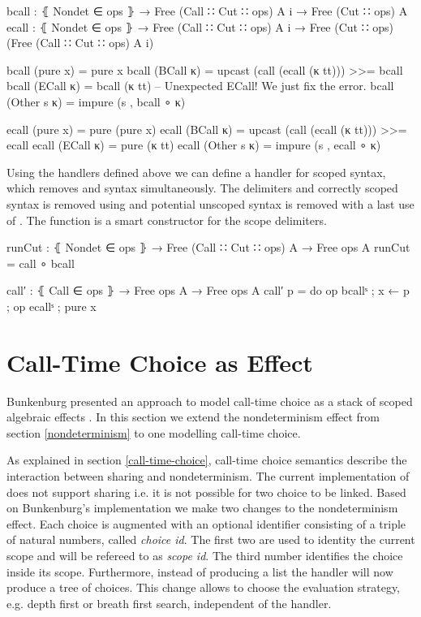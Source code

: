 \begin{code}
bcall : ⦃ Nondet ∈ ops ⦄ → Free (Call ∷ Cut ∷ ops) A {i} → Free (Cut ∷ ops) A
ecall : ⦃ Nondet ∈ ops ⦄ → Free (Call ∷ Cut ∷ ops) A {i}
  → Free (Cut ∷ ops) (Free (Call ∷ Cut ∷ ops) A {i})

bcall (pure x)     = pure x
bcall (BCall κ)    = upcast (call (ecall (κ tt))) >>= bcall
bcall (ECall κ)    = bcall (κ tt) -- Unexpected ECall! We just fix the error.
bcall (Other s κ)  = impure (s , bcall ∘ κ)

ecall (pure x)     = pure (pure x)
ecall (BCall κ)    = upcast (call (ecall (κ tt))) >>= ecall
ecall (ECall κ)    = pure (κ tt)
ecall (Other s κ)  = impure (s , ecall ∘ κ)
\end{code}
Using the handlers defined above we can define a handler for scoped
 syntax, which removes  and
 syntax simultaneously.
The delimiters and correctly scoped  syntax is removed using
 and potential unscoped  syntax is
removed with a last use of .
The function  is a smart constructor for the scope
delimiters.

\begin{code}
runCut : ⦃ Nondet ∈ ops ⦄ → Free (Call ∷ Cut ∷ ops) A → Free ops A
runCut = call ∘ bcall

call′ : ⦃ Call ∈ ops ⦄ → Free ops A → Free ops A
call′ p = do op bcallˢ ; x ← p ; op ecallˢ ; pure x
\end{code}

\section{Call-Time Choice as Effect}

Bunkenburg presented an approach to model call-time choice as a stack of
scoped algebraic effects \cite{bunkenburg2019modeling}.
In this section we extend the nondeterminism effect from section
\ref{nondeterminism} to one modelling call-time choice.

As explained in section \ref{call-time-choice}, call-time choice semantics
describe the interaction between sharing and nondeterminism.
The current implementation of  does not support sharing
i.e. it is not possible for two choice to be linked.
Based on Bunkenburg's implementation we make two changes to the
nondeterminism effect.
Each choice is augmented with an optional identifier consisting of a triple of
natural numbers, called \textit{choice id}.
The first two are used to identity the current scope and will be refereed to as
\textit{scope id}.
The third number identifies the choice inside its scope.
Furthermore, instead of producing a list the handler will now produce a tree of
choices.
This change allows to choose the evaluation strategy, e.g. depth first or breath
first search, independent of the handler.


